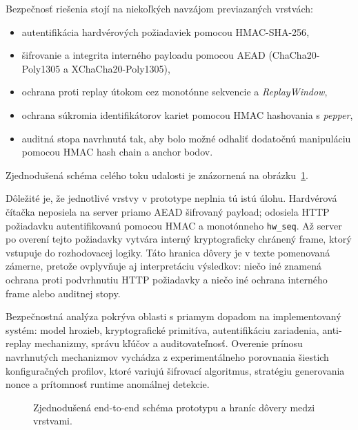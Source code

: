 \documentclass[journal,a4paper,onecolumn]{IEEEtran}
\begin{document}
Bezpečnosť riešenia stojí na niekoľkých navzájom previazaných vrstvách:

\begin{itemize}[leftmargin=*,itemsep=2pt]
  \item autentifikácia hardvérových požiadaviek pomocou HMAC-SHA-256\cite{FIPS1981},
  \item šifrovanie a integrita interného payloadu pomocou AEAD (ChaCha20-Poly1305\cite{RFC8439} a XChaCha20-Poly1305\cite{XChaChaDraft,LibsodiumXChaChaDoc}),
  \item ochrana proti replay útokom cez monotónne sekvencie a \emph{ReplayWindow},
  \item ochrana súkromia identifikátorov kariet pomocou HMAC hashovania s \emph{pepper},
  \item auditná stopa navrhnutá tak, aby bolo možné odhaliť dodatočnú manipuláciu pomocou HMAC hash chain a anchor bodov\cite{SchneierKelsey1999}.
\end{itemize}

Zjednodušená schéma celého toku udalosti je znázornená na obrázku~\ref{fig:e2e_overview}.

Dôležité je, že jednotlivé vrstvy v prototype neplnia tú istú úlohu. Hardvérová čítačka neposiela na server priamo AEAD šifrovaný payload; odosiela HTTP požiadavku autentifikovanú pomocou HMAC a monotónneho \texttt{hw\_seq}. Až server po overení tejto požiadavky vytvára interný kryptograficky chránený frame, ktorý vstupuje do rozhodovacej logiky. Táto hranica dôvery je v texte pomenovaná zámerne, pretože ovplyvňuje aj interpretáciu výsledkov: niečo iné znamená ochrana proti podvrhnutiu HTTP požiadavky a niečo iné ochrana interného frame alebo auditnej stopy.

Bezpečnostná analýza pokrýva oblasti s priamym dopadom na implementovaný systém: model hrozieb, kryptografické primitíva, autentifikáciu zariadenia, anti-replay mechanizmy, správu kľúčov a auditovateľnosť. Overenie prínosu navrhnutých mechanizmov vychádza z experimentálneho porovnania šiestich konfiguračných profilov, ktoré variujú šifrovací algoritmus, stratégiu generovania nonce a prítomnosť runtime anomálnej detekcie.


\begin{figure}[!ht]
\centering
{}
\caption{Zjednodušená end-to-end schéma prototypu a hraníc dôvery medzi vrstvami.}
\label{fig:e2e_overview}
\end{figure}
\end{document}
